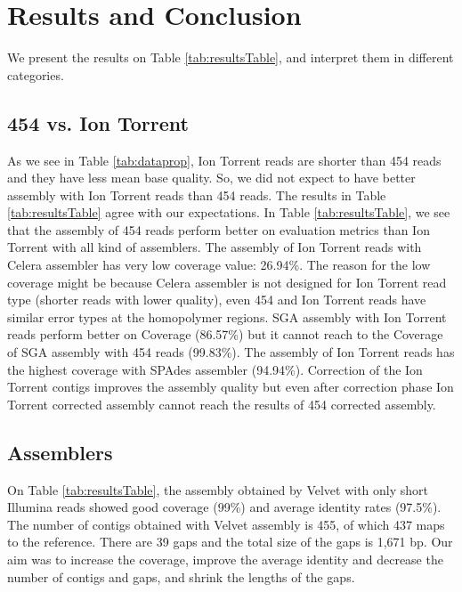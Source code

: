 \documentclass{llncs}
\begin{document}
\section{Results and Conclusion}
We present the results on Table \ref{tab:resultsTable}, and interpret them in different categories. 

\subsection{454 vs. Ion Torrent}
\label{454Ion}
As we see in Table \ref{tab:dataprop}, Ion Torrent reads are shorter than 454 reads and they have less mean base quality. So, we did not expect to have better assembly with Ion Torrent reads than 454 reads. The results in Table \ref{tab:resultsTable} agree with our expectations.
In Table \ref{tab:resultsTable}, we see that the assembly of 454 reads perform better on evaluation metrics than Ion Torrent with all kind of assemblers. The assembly of Ion Torrent reads with Celera assembler has very low coverage value: 26.94\%. The reason for the low coverage might be because Celera assembler is not designed for Ion Torrent read type (shorter reads with lower quality), even 454 and Ion Torrent reads have similar error types at the homopolymer regions. SGA assembly with Ion Torrent reads perform better on Coverage (86.57\%) but it cannot reach to the Coverage of SGA assembly with 454 reads (99.83\%). The assembly of Ion Torrent reads has the highest coverage with SPAdes assembler (94.94\%). Correction of the Ion Torrent contigs improves the assembly quality but even after correction phase Ion Torrent corrected assembly cannot reach the results of 454 corrected assembly. 

\subsection{Assemblers}

On Table \ref{tab:resultsTable}, the assembly obtained by Velvet with only short Illumina reads showed good coverage  (99\%) and average identity rates (97.5\%). The number of contigs obtained with Velvet assembly is 455, of which 437 maps to the reference. There are 39 gaps and the total size of the gaps is 1,671 bp. Our aim was to increase the coverage, improve the average identity and decrease the number of contigs and gaps, and shrink the lengths of the gaps.
\end{document}
